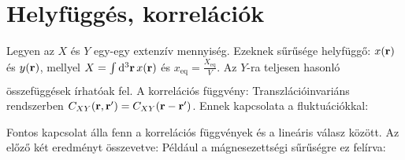  
 \section{Helyfüggés, korrelációk}
  
  Legyen az $X$ és $Y$ egy-egy extenzív mennyiség. Ezeknek sűrűsége helyfüggő: $x(\mathbf{r})$ és $y(\mathbf{r})$, mellyel $X=\int\limits_{}^{}\mathrm{d}^3\mathbf{r}\, x(\mathbf{r})$ és $x_\text{eq}=\frac{X_\text{eq}}{V}$. Az $Y$-ra teljesen hasonló összefüggések írhatóak fel. A korrelációs függvény:
  Transzlációinvariáns rendszerben $C_{XY}(\mathbf{r},\mathbf{r}')=C_{XY}(\mathbf{r}-\mathbf{r}')$. Ennek kapcsolata a fluktuációkkal:
  
  Fontos kapcsolat álla fenn a korrelációs függvények és a lineáris válasz között. Az előző két eredményt összevetve:
  Például a mágnesezettségi sűrűségre ez felírva:
